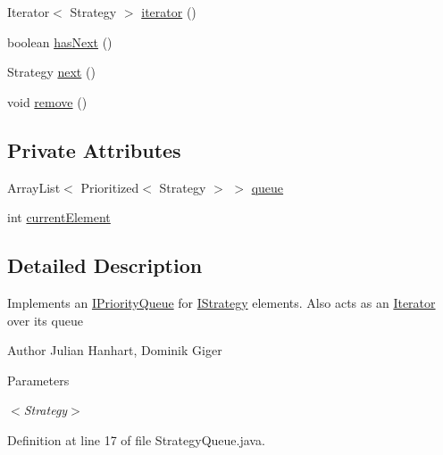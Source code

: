 \begin{DoxyCompactItemize}
Iterator$<$ Strategy $>$ \hyperlink{classch_1_1zhaw_1_1ba10__bsha__1_1_1service_1_1StrategyQueue_3_01Strategy_01extends_01IStrategy_01_4_af8e5c776860033a81d2a3f3b35ecf28d}{iterator} ()
\item 
boolean \hyperlink{classch_1_1zhaw_1_1ba10__bsha__1_1_1service_1_1StrategyQueue_3_01Strategy_01extends_01IStrategy_01_4_ad17a1d8ee0daf7fa8bf03ebcdf086e98}{hasNext} ()
\item 
Strategy \hyperlink{classch_1_1zhaw_1_1ba10__bsha__1_1_1service_1_1StrategyQueue_3_01Strategy_01extends_01IStrategy_01_4_accac6ec5804bd23cc0f7d8839ef613ad}{next} ()
\item 
void \hyperlink{classch_1_1zhaw_1_1ba10__bsha__1_1_1service_1_1StrategyQueue_3_01Strategy_01extends_01IStrategy_01_4_a74b39a093152962d2449bbd2951f5f56}{remove} ()
\end{DoxyCompactItemize}
\subsection*{Private Attributes}
\begin{DoxyCompactItemize}
\item 
ArrayList$<$ Prioritized$<$ Strategy $>$ $>$ \hyperlink{classch_1_1zhaw_1_1ba10__bsha__1_1_1service_1_1StrategyQueue_3_01Strategy_01extends_01IStrategy_01_4_a2a1363a6e0f87ad69ee2734381cfa657}{queue}
\item 
int \hyperlink{classch_1_1zhaw_1_1ba10__bsha__1_1_1service_1_1StrategyQueue_3_01Strategy_01extends_01IStrategy_01_4_ad91c57b63849448bf5f255fc077eaca1}{currentElement}
\end{DoxyCompactItemize}


\subsection{Detailed Description}
Implements an \hyperlink{}{IPriorityQueue} for \hyperlink{}{IStrategy} elements. Also acts as an \hyperlink{}{Iterator} over its queue

\begin{DoxyAuthor}{Author}
Julian Hanhart, Dominik Giger 
\end{DoxyAuthor}

\begin{DoxyParams}{Parameters}
\item[{\em $<$Strategy$>$}]\end{DoxyParams}


Definition at line 17 of file StrategyQueue.java.

